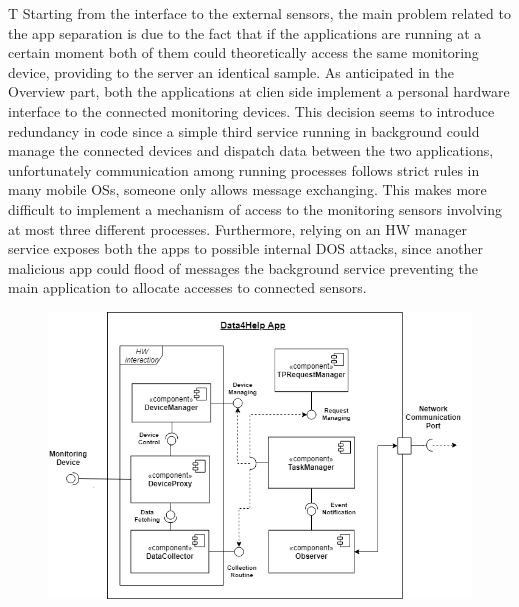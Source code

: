 \begin{flushleft}
 


{}
T
{}
Starting from the interface to the external sensors, the main problem related to the app separation is due to the fact that if the applications are running at a certain moment both of them could theoretically access the same monitoring device, providing to the server an identical sample. As anticipated in the Overview part, both the applications at clien side implement a personal hardware interface to the connected monitoring devices. This decision seems to introduce redundancy in code since a simple third service running in background could manage the connected devices and dispatch data between the two applications, unfortunately communication among running processes follows strict rules in many mobile OSs, someone only allows message exchanging. This makes more difficult to implement a mechanism of access to the monitoring sensors involving at most three different processes. Furthermore, relying on an HW manager service exposes both the apps to possible internal DOS attacks, since another malicious app could flood of messages the background service preventing the main application to allocate accesses to connected sensors.

\begin{figure}[H]
	\centering
	\includegraphics[scale=0.6]{images/uml/D4H_client_component}
	\caption{}
\end{figure}


\end{flushleft}
